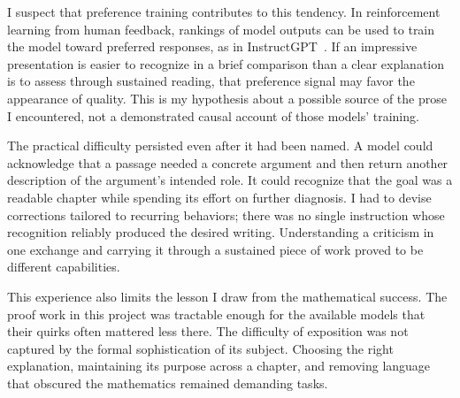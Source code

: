 I suspect that preference training contributes to this tendency. In
reinforcement learning from human feedback, rankings of model outputs can
be used to train the model toward preferred responses, as in
InstructGPT~\cite{aiOuyang2022}. If an impressive presentation is easier to
recognize in a brief comparison than a clear explanation is to assess
through sustained reading, that preference signal may favor the appearance
of quality. This is my hypothesis about a possible source of the prose I
encountered, not a demonstrated causal account of those models' training.

The practical difficulty persisted even after it had been named. A model
could acknowledge that a passage needed a concrete argument and then return
another description of the argument's intended role. It could recognize
that the goal was a readable chapter while spending its effort on further
diagnosis. I had to devise corrections tailored to recurring behaviors;
there was no single instruction whose recognition reliably produced the
desired writing. Understanding a criticism in one exchange and carrying it
through a sustained piece of work proved to be different capabilities.

This experience also limits the lesson I draw from the mathematical success.
The proof work in this project was tractable enough for the available models
that their quirks often mattered less there. The difficulty of exposition
was not captured by the formal sophistication of its subject. Choosing the
right explanation, maintaining its purpose across a chapter, and removing
language that obscured the mathematics remained demanding tasks.
